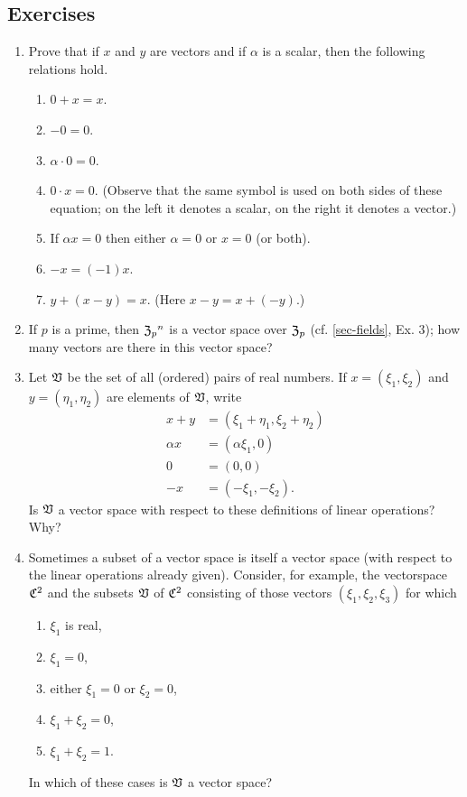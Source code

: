 {
\small
\subsection*{Exercises}
\begin{enumerate}[wide]
    \item Prove that if \(x\) and \(y\) are vectors and if \(\alpha\) is a
    scalar, then the following relations hold.
    \begin{enumerate}[wide, label=(\alph*), nosep]
        \item \(0 + x = x\).
        \item \(-0 = 0\).
        \item \(\alpha \cdot 0 = 0\).
        \item \(0 \cdot x = 0\). (Observe that the same symbol is used on both
        sides of these equation; on the left it denotes a scalar, on the right
        it denotes a vector.)
        \item If \(\alpha x = 0\) then either \(\alpha = 0\) or \(x = 0\) (or
        both).
        \item \(-x = (-1)x\).
        \item \(y + (x - y) = x\). (Here \(x - y = x + (-y)\).)
    \end{enumerate}
    \item If \(p\) is a prime, then \(\mathfrak{Z}_p{}^n\) is a vector space over
    \(\mathfrak{Z}_p\) (cf. \cref{sec-fields}, Ex. 3); how many vectors are there
    in this vector space?
    \item Let \(\mathfrak{V}\) be the set of all (ordered) pairs of real numbers. If
    \(x = (\xi_1, \xi_2)\) and \(y = (\eta_1, \eta_2)\) are elements of
    \(\mathfrak{V}\), write
    \begin{align*}
        x + y & = (\xi_1 + \eta_1, \xi_2 + \eta_2) \\
        \alpha x & = (\alpha \xi_1, 0) \\
        0 & = (0, 0)\\
        -x & = (-\xi_1, -\xi_2).
    \end{align*}
    Is \(\mathfrak{V}\) a vector space with respect to these definitions of linear
    operations? Why?

    \item Sometimes a subset of a vector space is itself a vector space (with
    respect to the linear operations already given). Consider, for example, the
    vectorspace \(\mathfrak{C}^2\) and the subsets \(\mathfrak{V}\) of \(\mathfrak{C}^2\)
    consisting of those vectors \((\xi_1, \xi_2, \xi_3)\) for which
    \begin{enumerate}[wide, label=(\alph*), nosep]
        \item \(\xi_1\) is real,
        \item \(\xi_1 = 0\),
        \item either \(\xi_1 = 0\) or \(\xi_2 = 0\),
        \item \(\xi_1 + \xi_2 = 0\),
        \item \(\xi_1 + \xi_2 = 1\).
    \end{enumerate}
    In which of these cases is \(\mathfrak{V}\) a vector space?


\end{enumerate}}
